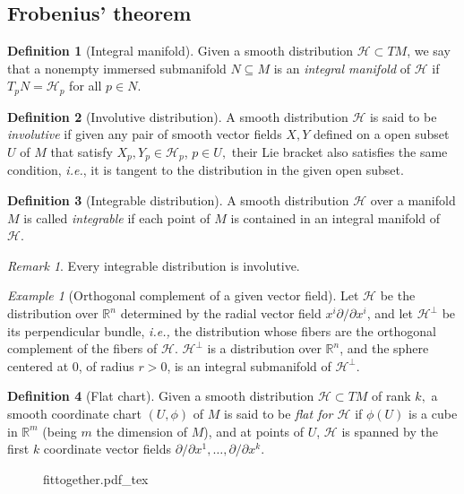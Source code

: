 \documentclass [xcolor=svgnames, t] {beamer}
\newcommand{\incfig}[2][1]{%
    \def\svgwidth{#1\columnwidth}
    {#2.pdf_tex}
}
\theoremstyle{definition}
\newtheorem{df}{Definition}
\theoremstyle{plain}
\theoremstyle{remark}
\newtheorem{ex}{Example}
\newtheorem{rem}{Remark}
\begin{document}
\subsection{Frobenius' theorem}
\begin{frame}
	\begin{df}[Integral manifold]
	Given a smooth distribution $ \mathcal{H} \subset TM$, we say that a nonempty immersed submanifold $ N\subseteq M $  is an \textit{integral manifold} of $\mathcal{H}$ if $ T_p N = \mathcal{H}_p $ for all $ p\in N $.
\end{df}
	\begin{df}[Involutive distribution]
A smooth distribution $ \mathcal{H} $ is said to be \textit{involutive} if given any pair of smooth vector fields $ X,Y $ defined on a open subset $ U $  of $ M $  that satisfy $X_p,Y_p\in \mathcal{H}_p $, $ p\in U, $ their Lie bracket also satisfies the same condition, \textit{i.e.}, it is tangent to the distribution in the given open subset. 
\end{df}
\begin{df}[Integrable distribution]
	A smooth distribution $ \mathcal{H} $ over a manifold $ M $ is called \textit{integrable} if each point of $ M $ is contained in an integral manifold of $ \mathcal{H}. $  
\end{df}
\begin{rem}
Every integrable distribution is involutive.	
\end{rem}
\begin{ex}[Orthogonal complement of a given vector field]
Let $ \mathcal{H} $ be the distribution over $ \mathbb{R}^n $ determined by the radial vector field $ x^i \partial / \partial x^i $, and let $ \mathcal{H}^\perp $ be its perpendicular bundle, \textit{i.e.,} the distribution whose fibers are the orthogonal complement of the fibers of $ \mathcal{H}. $ $ \mathcal{H}^\perp $ is a distribution over $ \mathbb{R}^n  $, and the sphere centered at $0$, of radius $r>0$, is an integral submanifold of $ \mathcal{H}^\perp. $        
\end{ex}


\end{frame}

\begin{frame}[fragile]
	\begin{df}[Flat chart]
	Given a smooth distribution $ \mathcal{H}\subset TM $  of rank $ k, $ a smooth coordinate chart $ (U,\phi) $ of $ M $ is said to be \textit{flat for $ \mathcal{H} $ } if $ \phi(U) $ is a cube in $ \mathbb{R}^m  $ (being $ m $ the dimension of $ M $), and at points of $ U $, $ \mathcal{H} $ is spanned by the first $ k $ coordinate vector fields $ \partial/\partial x^1,\dots,\partial/\partial x^k $.
\end{df}
	
\begin{figure}
    \centering
    \incfig[0.9]{fittogether}
    \label{fig:fittogether}
\end{figure}
\end{frame}
\end{document}
